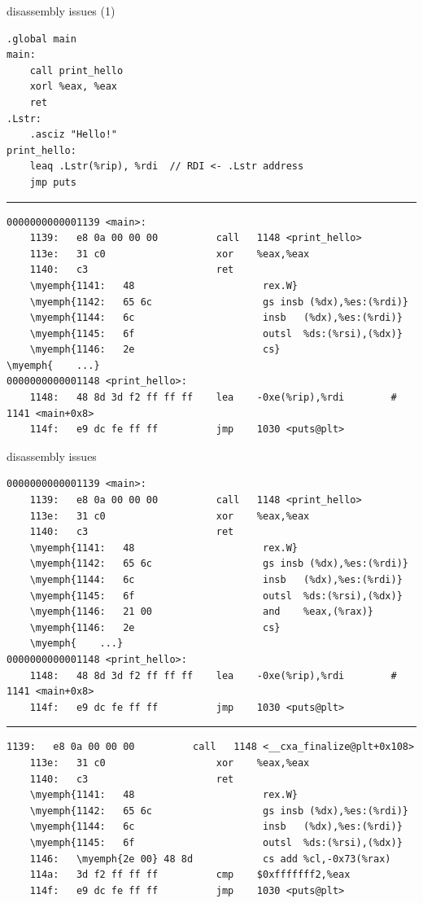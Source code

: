 \begin{frame}[fragile]{disassembly issues (1)}
\begin{lstlisting}[language=myasm,style=size8]
.global main
main:
    call print_hello
    xorl %eax, %eax
    ret
.Lstr:
    .asciz "Hello!"
print_hello:
    leaq .Lstr(%rip), %rdi  // RDI <- .Lstr address
    jmp puts
\end{lstlisting}
\hrule
\begin{Verbatim}[fontsize=\fontsize{8}{9},commandchars=\\\{\}]
0000000000001139 <main>:
    1139:	e8 0a 00 00 00       	call   1148 <print_hello>
    113e:	31 c0                	xor    %eax,%eax
    1140:	c3                   	ret    
    \myemph{1141:	48                   	rex.W}
    \myemph{1142:	65 6c                	gs insb (%dx),%es:(%rdi)}
    \myemph{1144:	6c                   	insb   (%dx),%es:(%rdi)}
    \myemph{1145:	6f                   	outsl  %ds:(%rsi),(%dx)}
    \myemph{1146:	2e                   	cs}
\myemph{	...}
0000000000001148 <print_hello>:
    1148:	48 8d 3d f2 ff ff ff 	lea    -0xe(%rip),%rdi        # 1141 <main+0x8>
    114f:	e9 dc fe ff ff       	jmp    1030 <puts@plt>
\end{Verbatim}
\end{frame}

\begin{frame}[fragile]{disassembly issues}
\begin{Verbatim}[fontsize=\fontsize{8}{9},commandchars=\\\{\}]
0000000000001139 <main>:
    1139:	e8 0a 00 00 00       	call   1148 <print_hello>
    113e:	31 c0                	xor    %eax,%eax
    1140:	c3                   	ret    
    \myemph{1141:	48                   	rex.W}
    \myemph{1142:	65 6c                	gs insb (%dx),%es:(%rdi)}
    \myemph{1144:	6c                   	insb   (%dx),%es:(%rdi)}
    \myemph{1145:	6f                   	outsl  %ds:(%rsi),(%dx)}
    \myemph{1146:	21 00                	and    %eax,(%rax)}
    \myemph{1146:	2e                   	cs}
    \myemph{	...}
0000000000001148 <print_hello>:
    1148:	48 8d 3d f2 ff ff ff 	lea    -0xe(%rip),%rdi        # 1141 <main+0x8>
    114f:	e9 dc fe ff ff       	jmp    1030 <puts@plt>
\end{Verbatim}
\hrule
\begin{Verbatim}[fontsize=\fontsize{8}{9},commandchars=\\\{\}]
    1139:	e8 0a 00 00 00       	call   1148 <__cxa_finalize@plt+0x108>
    113e:	31 c0                	xor    %eax,%eax
    1140:	c3                   	ret    
    \myemph{1141:	48                   	rex.W}
    \myemph{1142:	65 6c                	gs insb (%dx),%es:(%rdi)}
    \myemph{1144:	6c                   	insb   (%dx),%es:(%rdi)}
    \myemph{1145:	6f                   	outsl  %ds:(%rsi),(%dx)}
    1146:	\myemph{2e 00} 48 8d          	cs add %cl,-0x73(%rax)
    114a:	3d f2 ff ff ff       	cmp    $0xfffffff2,%eax
    114f:	e9 dc fe ff ff       	jmp    1030 <puts@plt>
\end{Verbatim}
\end{frame}


